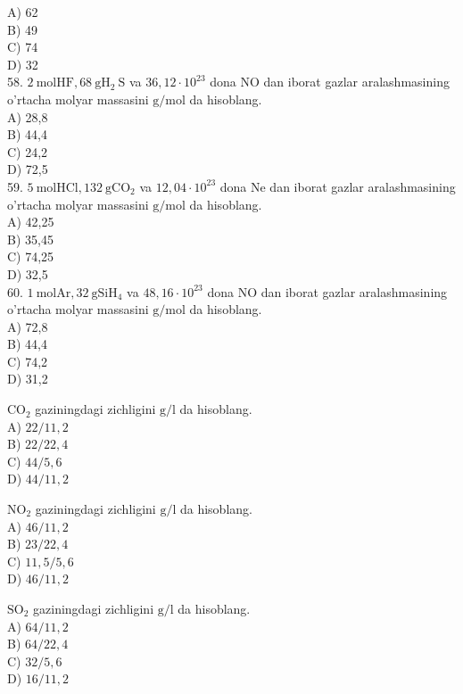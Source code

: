 A) 62\\
B) 49\\
C) 74\\
D) 32\\
58. $2 \mathrm{~mol} \mathrm{HF}, 68 \mathrm{~g} \mathrm{H}_{2} \mathrm{~S}$ va $36,12 \cdot 10^{23}$ dona NO dan iborat gazlar aralashmasining o'rtacha molyar massasini $\mathrm{g} / \mathrm{mol}$ da hisoblang.\\
A) 28,8\\
B) 44,4\\
C) 24,2\\
D) 72,5\\
59. $5 \mathrm{~mol} \mathrm{HCl}, 132 \mathrm{~g} \mathrm{CO}_{2}$ va $12,04 \cdot 10^{23}$ dona Ne dan iborat gazlar aralashmasining o'rtacha molyar massasini $\mathrm{g} / \mathrm{mol}$ da hisoblang.\\
A) 42,25\\
B) 35,45\\
C) 74,25\\
D) 32,5\\
60. $1 \mathrm{~mol} \mathrm{Ar} ,32 \mathrm{~g} \mathrm{SiH}_{4}$ va $48,16 \cdot 10^{23}$ dona NO dan iborat gazlar aralashmasining o'rtacha molyar massasini $\mathrm{g} / \mathrm{mol}$ da hisoblang.\\
A) 72,8\\
B) 44,4\\
C) 74,2\\
D) 31,2
  \item $\mathrm{CO}_{2}$ gaziningdagi zichligini $\mathrm{g} / \mathrm{l}$ da hisoblang.\\
A) $22 / 11,2$\\
B) $22 / 22,4$\\
C) $44 / 5,6$\\
D) $44 / 11,2$\\
  \item $\mathrm{NO}_{2}$ gaziningdagi zichligini $\mathrm{g} / \mathrm{l}$ da hisoblang.\\
A) $46 / 11,2$\\
B) $23 / 22,4$\\
C) $11,5 / 5,6$\\
D) $46 / 11,2$
  \item $\mathrm{SO}_{2}$ gaziningdagi zichligini $\mathrm{g} / \mathrm{l}$ da hisoblang.\\
A) $64 / 11,2$\\
B) $64 / 22,4$\\
C) $32 / 5,6$\\
D) $16 / 11,2$

